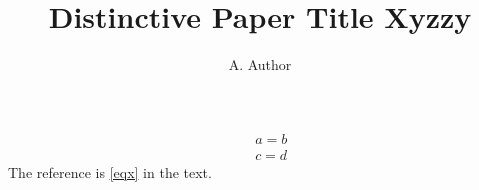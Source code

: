 \documentclass{article}
\begin{document}
\title{Distinctive Paper Title Xyzzy}
\author{A. Author}
\maketitle
\begin{eqnarray}\label{eqx}
&& a = b \nonumber\\
&& c = d
\end{eqnarray}
The reference is \ref{eqx} in the text.
\end{document}

